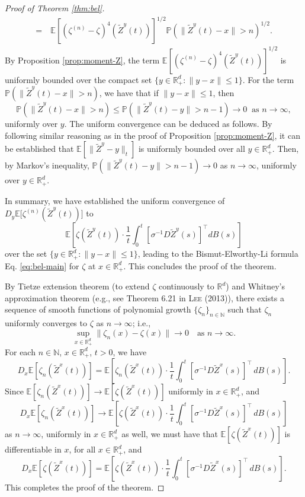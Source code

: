 \documentclass[11pt]{article}
\theoremstyle{definition}
\theoremstyle{plain}
\newcommand{\R}{\mathbb{R}}
\newcommand{\pr}{\mathbb{P}}
\newcommand{\E}{\mathbb{E}}
\begin{document}
\begin{proof}[Proof of Theorem \ref{thm:bel}]
\begin{align*}
= &~ \E \left[ \left(\zeta^{(n)}-\zeta \right)^4(\tilde Z^y(t))\right]^{1/2} \pr\left(\|\tilde Z^y(t) - x\|> n\right)^{1/2}.
\end{align*}
By Proposition \ref{prop:moment-Z}, the term $\E \left[ \left(\zeta^{(n)}-\zeta \right)^4(\tilde Z^y(t))\right]^{1/2}$ is uniformly bounded 
over the compact set $\{y \in \R_+^d : \|y-x\|\leq 1\}$. For the term $\pr\left(\|\tilde Z^y(t) - x\|> n\right)$, we have that if $\|y-x\|\leq 1$, then 
\[
\pr\left(\|\tilde Z^y(t) - x\|> n\right) \leq \pr\left(\|\tilde Z^y(t) - y\|> n-1\right) \to 0 \ \text{ as } n \to \infty, 
\]
uniformly over $y$. The uniform convergence can be deduced as follows. By following similar reasoning as in the proof of Proposition \ref{prop:moment-Z}, 
it can be established that $\E\left[\|\tilde Z^y - y\|_t\right]$ is uniformly bounded over all $y \in \R_+^d$. Then, by Markov's inequality, 
$\pr\left(\|\tilde Z^y(t) - y\|> n-1\right) \to 0$ as $n \to \infty$, uniformly over $y \in \R_+^d$.

In summary, we have established the uniform convergence of $D_y \mathbb{E} \bigl[ \zeta^{(n)}(\tilde Z^y(t)) \bigr]$ to 
\[
\mathbb{E} \left[ \zeta(\tilde Z^y(t)) \cdot \frac{1}{t} \int_0^t \left[\sigma^{-1} D\tilde Z^y(s)\right]^{\top} dB(s) \right]
\]
over the set $\{y \in \R_+^d : \|y-x\|\leq 1\}$, leading to the Bismut-Elworthy-Li formula Eq. \eqref{eq:bel-main} 
for $\zeta$ at $x \in \R_+^d$. This concludes the proof of the theorem. 

By Tietze extension theorem (to extend $\zeta$ continuously to $\R^d$) and 
Whitney’s approximation theorem (e.g., see Theorem 6.21 in \textsc{Lee} (2013)),  
there exists a sequence of smooth functions of polynomial growth \( \{ \zeta_n \}_{n \in \mathbb{N}} \)  
such that \( \zeta_n \) uniformly converges to \( \zeta \) as \( n \to \infty \); i.e.,
\[
\sup_{x \in \mathbb{R}_+^d} \| \zeta_n(x) - \zeta(x) \| \to 0 \quad \text{as } n \to \infty.
\]
For each \( n \in \mathbb{N} \), \( x \in \mathbb{R}_+^d \), \( t > 0 \), we have
\[
D_x \mathbb{E}[\zeta_n(\tilde{Z}^x(t))] = \mathbb{E}\left[ \zeta_n(\tilde{Z}^x(t)) \cdot \frac{1}{t}\int_0^t \left[\sigma^{-1} D\tilde Z^x(s)\right]^{\top} \, dB(s) \right].
\]
Since \( \mathbb{E}[\zeta_n(\tilde{Z}^x(t))] \to \mathbb{E}[\zeta(\tilde{Z}^x(t))] \) uniformly in \( x \in \mathbb{R}_+^d \), and
\[
D_x \mathbb{E}[\zeta_n(\tilde{Z}^x(t))] \to \mathbb{E}\left[ \zeta(\tilde{Z}^x(t)) \cdot \frac{1}{t} \int_0^t \left[\sigma^{-1} D\tilde Z^x(s)\right]^{\top} \, dB(s) \right]
\]
as \( n \to \infty \), uniformly in \( x \in \mathbb{R}_+^d \) as well, 
we must have that \( \mathbb{E}[\zeta(\tilde{Z}^x(t))] \) is differentiable in \( x \), for all \( x \in \mathbb{R}_+^d \), and
\[
D_x \mathbb{E}[\zeta(\tilde{Z}^x(t))] = \mathbb{E}\left[ \zeta(\tilde{Z}^x(t))\cdot \frac{1}{t}\int_0^t \left[\sigma^{-1} D\tilde Z^x(s)\right]^{\top} \, dB(s) \right].
\]
This completes the proof of the theorem.
\fi
\end{proof}
\end{document}
